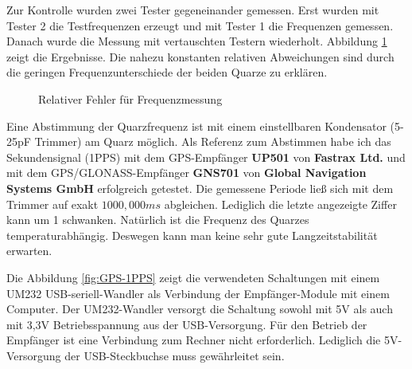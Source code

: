 Zur Kontrolle wurden zwei Tester gegeneinander gemessen.
Erst wurden mit Tester 2 die Testfrequenzen erzeugt und mit Tester 1 die Frequenzen gemessen.
Danach wurde die Messung mit vertauschten Testern wiederholt.
Abbildung \ref{fig:freq-ppm} zeigt die Ergebnisse.
Die nahezu konstanten relativen Abweichungen sind durch die geringen Frequenzunterschiede der beiden Quarze zu erklären.

\begin{figure}[H]
\centering

\caption{Relativer Fehler für Frequenzmessung }
\label{fig:freq-ppm}
\end{figure}

Eine Abstimmung der Quarzfrequenz ist mit einem einstellbaren Kondensator (5-25pF Trimmer) am Quarz möglich.
Als Referenz zum Abstimmen habe ich das Sekundensignal (1PPS) mit dem GPS-Empfänger {\bf UP501} von {\bf Fastrax Ltd.} und
mit dem GPS/GLONASS-Empfänger {\bf GNS701} von {\bf Global Navigation Systems GmbH} erfolgreich getestet.
Die gemessene Periode ließ sich mit dem Trimmer auf exakt \(1000,000 ms\) abgleichen.
Lediglich die letzte angezeigte Ziffer kann um 1 schwanken.
Natürlich ist die Frequenz des Quarzes temperaturabhängig.
Deswegen kann man keine sehr gute Langzeitstabilität erwarten.

Die Abbildung \ref{fig:GPS-1PPS} zeigt die verwendeten Schaltungen mit einem
UM232 USB-seriell-Wandler als Verbindung der Empfänger-Module mit einem Computer.
Der UM232-Wandler versorgt die Schaltung sowohl mit 5V als auch mit 3,3V Betriebsspannung
aus der USB-Versorgung.
Für den Betrieb der Empfänger ist eine Verbindung zum Rechner nicht erforderlich.
Lediglich die 5V-Versorgung der USB-Steckbuchse muss gewährleitet sein.

